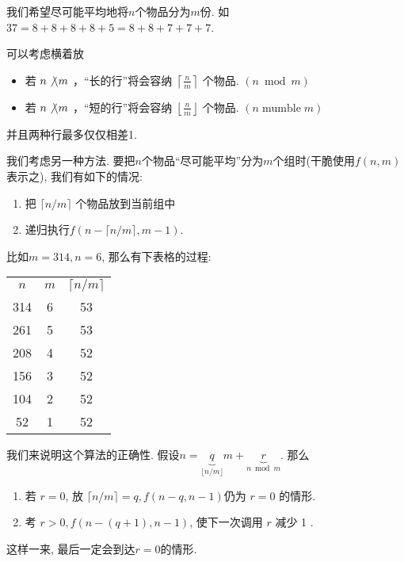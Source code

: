 \documentclass{ctexart}
\begin{document}
\begin{example}
    我们希望尽可能平均地将$n$个物品分为$m$份. 如$37=8+8+8+8+5=8+8+7+7+7$. 


    可以考虑横着放
    \begin{itemize}
        \item 若 $n \not\backslash m$ ，“长的行”将会容纳 $\left\lceil\frac{n}{m}\right\rceil$ 个物品. $(n \bmod m)$
        \item 若 $n \not\backslash m$ ，“短的行”将会容纳 $\left\lfloor\frac{n}{m}\right\rfloor$ 个物品. $(n \operatorname{mumble} m)$
    \end{itemize}
    并且两种行最多仅仅相差1. 

    我们考虑另一种方法. 要把$n$个物品“尽可能平均”分为$m$个组时(干脆使用$f(n,m)$表示之),  我们有如下的情况: 
    \begin{enumerate}
        \item 把 $\lceil n / m\rceil$ 个物品放到当前组中
        \item 递归执行$f(n-\lceil n / m\rceil, m-1)$. 
    \end{enumerate}

    比如$m=314, n=6$, 那么有下表格的过程: 

    \begin{center}
        \begin{tabular}{|ccc|}
\hline$n$ & $m$ & $\lceil n / m\rceil$ \\
314 & 6 & 53 \\
261 & 5 & 53 \\
208 & 4 & 52 \\
156 & 3 & 52 \\
104 & 2 & 52 \\
52 & 1 & 52 \\
\hline
\end{tabular}
    \end{center}


    我们来说明这个算法的正确性. 假设$n=\underbrace{q}_{\lfloor n/m \rfloor} m+\underbrace{r}_{n\bmod m}$. 那么
    \begin{enumerate}
        \item 若 $r=0$, 放 $\lceil n / m\rceil=q, f(n-q, n-1)$仍为 $r=0$ 的情形. 
        \item 考 $r>0, f(n-(q+1), n-1)$, 使下一次调用 $r$ 减少 1 .
    \end{enumerate}

    这样一来, 最后一定会到达$r=0$的情形. 


\end{example}
\end{document}
